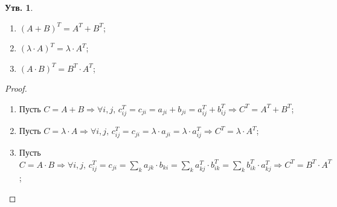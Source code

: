 \documentclass[12pt]{article}
\theoremstyle{definition}
\newtheorem{prop}{Утв.}
\newcommand{\ddsum}[2]{\displaystyle\sum\limits_{#1}^{#2}}
\begin{document}
\begin{prop}\hfill
	\begin{enumerate}[label=(\arabic*)]
		\item $(A+B)^T = A^T  + B^T$;
		\item $(\lambda{\cdot}A)^T = \lambda{\cdot}A^T$;
		\item $(A{\cdot}B)^T = B^T{\cdot}A^T$;
	\end{enumerate}
\end{prop}
\begin{proof}\hfill
	\begin{enumerate}[label=(\arabic*)]
		\item Пусть $C = A +B \Rightarrow \forall i,j, \, c_{ij}^T = c_{ji} = a_{ji} + b_{ji} = a_{ij}^T + b_{ij}^T \Rightarrow C^T = A^T + B^T$;
		\item Пусть $C = \lambda{\cdot}A \Rightarrow \forall i,j, \, c_{ij}^T = c_{ji} = \lambda{\cdot}a_{ji} = \lambda{\cdot}a_{ij}^T \Rightarrow C^T = \lambda{\cdot}A^T$;
		\item Пусть $C = A{\cdot}B \Rightarrow \forall i,j, \, c_{ij}^T = c_{ji} = \ddsum{k}{}a_{jk}{\cdot}b_{ki} = \ddsum{k}{}a_{kj}^T{\cdot}b_{ik}^T = \ddsum{k}{}b_{ik}^T{\cdot}a_{kj}^T \Rightarrow C^T = B^T{\cdot}A^T$;
	\end{enumerate}
	
\end{proof}
\end{document}
